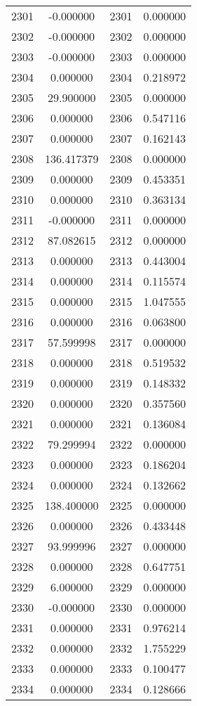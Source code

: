 \documentclass[12pt]{article}
\begin{document}
\begin{longtable}{@{}cccc@{}}
2301 & -0.000000 & 2301 & 0.000000 \\
2302 & -0.000000 & 2302 & 0.000000 \\
2303 & -0.000000 & 2303 & 0.000000 \\
2304 & 0.000000 & 2304 & 0.218972 \\
2305 & 29.900000 & 2305 & 0.000000 \\
2306 & 0.000000 & 2306 & 0.547116 \\
2307 & 0.000000 & 2307 & 0.162143 \\
2308 & 136.417379 & 2308 & 0.000000 \\
2309 & 0.000000 & 2309 & 0.453351 \\
2310 & 0.000000 & 2310 & 0.363134 \\
2311 & -0.000000 & 2311 & 0.000000 \\
2312 & 87.082615 & 2312 & 0.000000 \\
2313 & 0.000000 & 2313 & 0.443004 \\
2314 & 0.000000 & 2314 & 0.115574 \\
2315 & 0.000000 & 2315 & 1.047555 \\
2316 & 0.000000 & 2316 & 0.063800 \\
2317 & 57.599998 & 2317 & 0.000000 \\
2318 & 0.000000 & 2318 & 0.519532 \\
2319 & 0.000000 & 2319 & 0.148332 \\
2320 & 0.000000 & 2320 & 0.357560 \\
2321 & 0.000000 & 2321 & 0.136084 \\
2322 & 79.299994 & 2322 & 0.000000 \\
2323 & 0.000000 & 2323 & 0.186204 \\
2324 & 0.000000 & 2324 & 0.132662 \\
2325 & 138.400000 & 2325 & 0.000000 \\
2326 & 0.000000 & 2326 & 0.433448 \\
2327 & 93.999996 & 2327 & 0.000000 \\
2328 & 0.000000 & 2328 & 0.647751 \\
2329 & 6.000000 & 2329 & 0.000000 \\
2330 & -0.000000 & 2330 & 0.000000 \\
2331 & 0.000000 & 2331 & 0.976214 \\
2332 & 0.000000 & 2332 & 1.755229 \\
2333 & 0.000000 & 2333 & 0.100477 \\
2334 & 0.000000 & 2334 & 0.128666 \\

\end{longtable}
\end{document}
